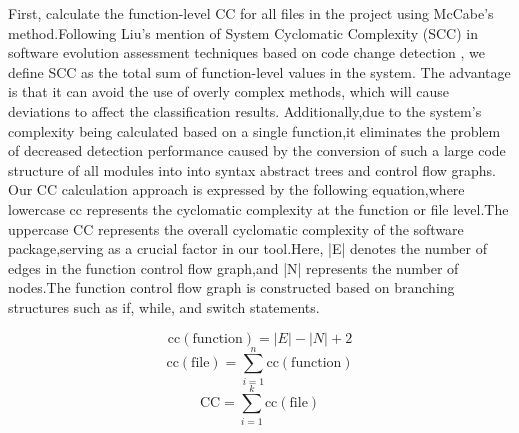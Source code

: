 \documentclass[sigconf,screen,review,anonymous]{acmart}
\begin{document}
First, calculate the function-level CC for all files in the project using McCabe's method.Following Liu's mention of System Cyclomatic Complexity (SCC) in software evolution assessment techniques based on code change detection \cite{liuhuihui00}, we define SCC as the total sum of function-level values in the system.
  The advantage is that it can avoid the use of overly complex methods, which will cause deviations to affect the classification results.
  Additionally,due to the system's complexity being calculated based on a single function,it eliminates the problem of decreased detection performance caused by the conversion of such a large code structure of all modules into into syntax abstract trees and control flow graphs.
  Our CC calculation approach is expressed by the following equation,where lowercase cc represents the cyclomatic complexity at the function or file level.The uppercase CC represents the overall cyclomatic complexity of the software package,serving as a crucial factor in our tool.Here, |E| denotes the number of edges in the function control flow graph,and |N| represents the number of nodes.The function control flow graph is constructed based on branching structures such as if, while, and switch statements. 
  
  \begin{equation}
    \mathrm{cc}(\mathrm{function}) = \lvert E \rvert - \lvert N \rvert + 2
    \end{equation}
    \begin{equation}
      \mathrm{cc}(\mathrm{file}) =  \sum_{i=1}^{n} \mathrm{cc}(\mathrm{function})
      \end{equation}
      \begin{equation}
        \mathrm{CC} =  \sum_{i=1}^{k} \mathrm{cc}(\mathrm{file})
        \end{equation}
\end{document}
